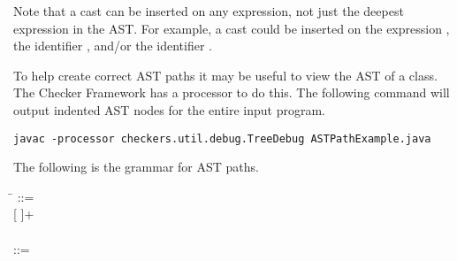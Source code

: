 \documentclass{article}
\newcommand{\code}[1]{\ifmmode{\mbox{\relax\ttfamily{#1}}}\else{\relax\ttfamily #1}\fi}
\begin{document}
Note that a cast can be inserted on any expression, not
just the deepest expression in the AST. For example, a cast could be inserted on
the expression \code{i + j}, the identifier \code{i}, and/or the identifier \code{j}.

To help create correct AST paths it may be useful to view the AST of a class.
The Checker Framework has a processor to do this. The following command will
output indented AST nodes for the entire input program.

\begin{verbatim}
javac -processor checkers.util.debug.TreeDebug ASTPathExample.java
\end{verbatim}

The following is the grammar for AST paths.

\begin{tabbing}
\qquad \= \kill
{} ::= \\
\qquad    {} [ \bnflit{,}  ]+ \\
\\
 ::= \\
\qquad    {} \\
\qquad    \bnfor{}  \\
\qquad    \bnfor{}  \\
\qquad    \bnfor{}  \\
\qquad    \bnfor{}  \\
\qquad    \bnfor{}  \\
\qquad    \bnfor{}  \\
\qquad    \bnfor{}  \\
\qquad    \bnfor{}  \\
\qquad    \bnfor{}  \\
\qquad    \bnfor{}  \\
\qquad    \bnfor{}  \\
\qquad    \bnfor{}  \\
\qquad    \bnfor{}  \\
\qquad    \bnfor{}  \\
\qquad    \bnfor{}  \\
\qquad    \bnfor{}  \\
\qquad    \bnfor{}  \\

\end{tabbing}
\end{document}
